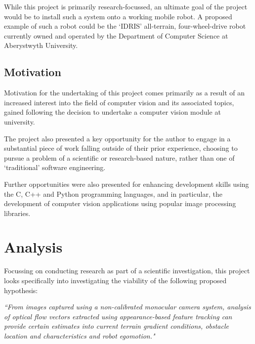 
While this project is primarily research-focussed, an ultimate goal of the project would be to install such a system onto a working mobile robot. A proposed example of such a robot could be the `IDRIS' all-terrain, four-wheel-drive robot currently owned and operated by the Department of Computer Science at Aberystwyth University.


\subsection{Motivation}

Motivation for the undertaking of this project comes primarily as a result of an increased interest into the field of computer vision and its associated topics, gained following the decision to undertake a computer vision module at university.

The project also presented a key opportunity for the author to engage in a substantial piece of work falling outside of their prior experience, choosing to pursue a problem of a scientific or research-based nature, rather than one of `traditional' software engineering. 

Further opportunities were also presented for enhancing development skills using the C, C++ and Python programming languages, and in particular, the development of computer vision applications using popular image processing libraries.


\section{Analysis}

Focussing on conducting research as part of a scientific investigation, this project looks specifically into investigating the viability of the following proposed hypothesis: 

\indent \textit{``From images captured using a non-calibrated monocular camera system, analysis of optical flow vectors extracted using appearance-based feature tracking can provide certain estimates into current terrain gradient conditions, obstacle location and characteristics and robot egomotion."}
 
